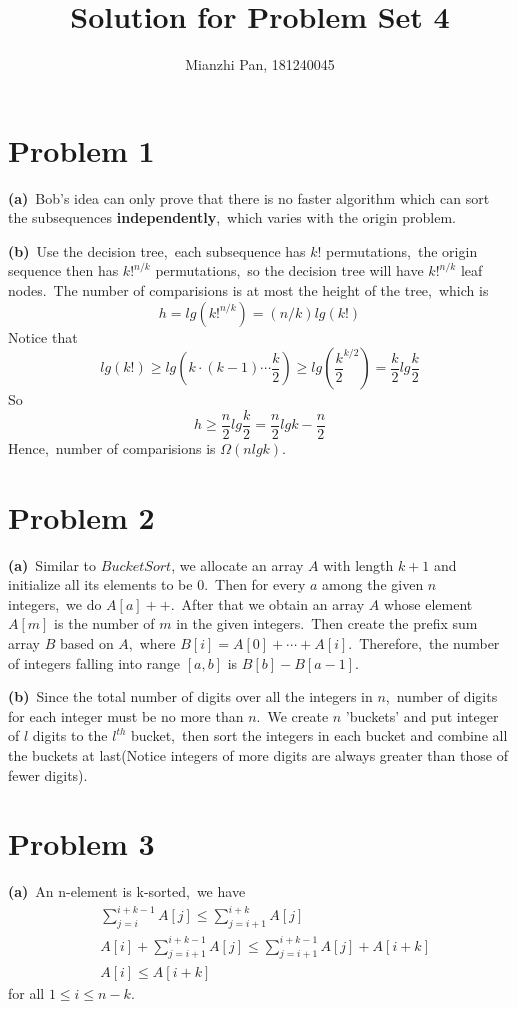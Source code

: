 \documentclass[]{article}
\title{Solution for Problem Set 4}
\author{Mianzhi Pan, 181240045}
\begin{document}
	\maketitle
	\section{Problem 1}
	\textbf{(a)}\ Bob's idea can only prove that there is no faster algorithm which can sort the subsequences \textbf{independently},\ which varies with the origin problem.
	
	\textbf{(b)}\ Use the decision tree,\ each subsequence has $k!$ permutations,\ the origin sequence then has $k!^{n/k}$ permutations,\ so the decision tree will have $k!^{n/k}$ leaf nodes.\ The number of comparisions is at most the height of the tree,\ which is
	\begin{equation*}
	h = lg(k!^{n/k}) = (n/k)lg(k!)
	\end{equation*}
	Notice that
	\begin{equation*}
	lg(k!) \geq lg(k\cdot (k-1)\cdots \frac{k}{2}) \geq lg(\frac{k}{2}^{k/2}) = \frac{k}{2}lg\frac{k}{2}
	\end{equation*}
	So
	\begin{equation*}
	h \geq \frac{n}{2}lg\frac{k}{2} = \frac{n}{2}lgk - \frac{n}{2}
	\end{equation*}
	Hence,\ number of comparisions is $\Omega(nlgk)$.
	
	\section{Problem 2}
	\textbf{(a)}\ Similar to $Bucket Sort$, we allocate an array $A$ with length $k+1$ and initialize all its elements to be $0$.\ Then for every $a$ among the given $n$ integers,\ we do $A[a] ++$.\ After that we obtain an array $A$ whose element $A[m]$ is the number of $m$ in the given integers.\ Then create the prefix sum array $B$ based on $A$,\ where $B[i] = A[0] + \cdots + A[i]$.\ Therefore,\ the number of integers falling into range $[a,b]$ is $B[b] - B[a-1]$.
	
	\textbf{(b)}\ Since the total number of digits over all the integers in $n$,\ number of digits for each integer must be no more than $n$.\ We create $n$ 'buckets' and put integer of $l$ digits to the $l^{th}$ bucket,\ then sort the integers in each bucket and combine all the buckets at last(Notice integers of more digits are always greater than those of fewer digits).
	
	\section{Problem 3}
	\textbf{(a)}\ An n-element is k-sorted,\ we have
	\begin{equation*}
	\begin{aligned}
	& \sum_{j=i}^{i+k-1}A[j] \leq \sum_{j=i+1}^{i+k}A[j]\\
	& A[i] + \sum_{j=i+1}^{i+k-1}A[j] \leq \sum_{j=i+1}^{i+k-1}A[j] + A[i+k]\\
	& A[i] \leq A[i+k]
	\end{aligned}
	\end{equation*}
	for all $1\leq i\leq n-k$.
	
\end{document}
